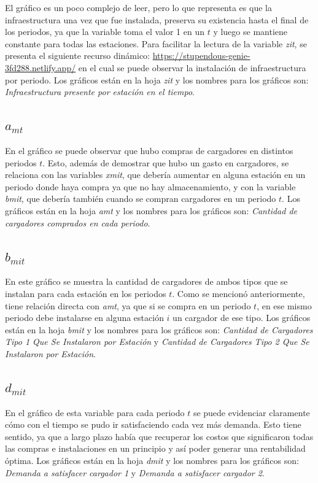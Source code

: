 \documentclass[letterpaper]{article}
\begin{document}
\begin{flushleft}
	El gráfico es un poco complejo de leer, pero lo que representa es que la infraestructura una vez que fue instalada, preserva su existencia hasta el final de los periodos, ya que la variable toma el valor 1 en un $t$ y luego se mantiene constante para todas las estaciones. Para facilitar la lectura de la variable \textit{zit}, se presenta el siguiente recurso dinámico: \url{https://stupendous-genie-3fd288.netlify.app/} en el cual se puede observar la instalación de infraestructura por periodo. Los gráficos están en la hoja \textit{zit} y los nombres para los gráficos son: \textit{Infraestructura presente por estación en el tiempo}.

	\subsection{$a_{mt}$}

	En el gráfico se puede observar que hubo compras de cargadores en distintos periodos $t$. Esto, además de demostrar que hubo un gasto en cargadores, se relaciona con las variables \textit{xmit}, que debería aumentar en alguna estación en un periodo donde haya compra ya que no hay almacenamiento, y con la variable \textit{bmit}, que debería también cuando se compran cargadores en un periodo $t$. Los gráficos están en la hoja \textit{amt} y los nombres para los gráficos son: \textit{Cantidad de cargadores comprados en cada periodo}.

	\subsection{$b_{mit}$}

	En este gráfico se muestra la cantidad de cargadores de ambos tipos que se instalan para cada estación en los periodos $t$. Como se mencionó anteriormente, tiene relación directa con \textit{amt}, ya que si se compra en un periodo $t$, en ese mismo periodo debe instalarse en alguna estación $i$ un cargador de ese tipo. Los gráficos están en la hoja \textit{bmit} y los nombres para los gráficos son: \textit{Cantidad de Cargadores Tipo 1 Que Se Instalaron por Estación} y \textit{Cantidad de Cargadores Tipo 2 Que Se Instalaron por Estación}.

	\subsection{$d_{mit}$}

	En el gráfico de esta variable para cada periodo $t$ se puede evidenciar claramente cómo con el tiempo se pudo ir satisfaciendo cada vez más demanda. Esto tiene sentido, ya que a largo plazo había que recuperar los costos que significaron todas las compras e instalaciones en un principio y así poder generar una rentabilidad óptima. Los gráficos están en la hoja \textit{dmit} y los nombres para los gráficos son: \textit{Demanda a satisfacer cargador 1} y \textit{Demanda a satisfacer cargador 2}.


\end{flushleft}
\end{document}
